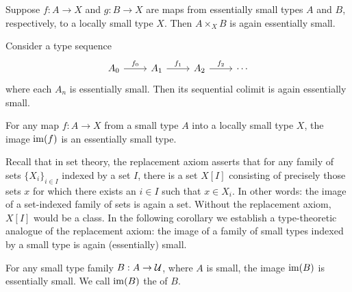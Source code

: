 \begin{cor}
Suppose $f:A\to X$ and $g:B\to X$ are maps from essentially small types $A$ and $B$, respectively, to a locally small type $X$. Then $A\times_X B$ is again essentially small. 
\end{cor}

\begin{lem}
Consider a type sequence
\begin{equation*}
\begin{tikzcd}
A_0 \arrow[r,"f_0"] & A_1 \arrow[r,"f_1"] & A_2 \arrow[r,"f_2"] & \cdots
\end{tikzcd}
\end{equation*}
where each $A_n$ is essentially small. Then its sequential colimit is again essentially small. 
\end{lem}

\begin{thm}\label{thm:image_small}
For any map $f:A\to X$ from a small type $A$ into a locally small type $X$, the image $\operatorname{im}(f)$ is an essentially small type.
\end{thm}

Recall that in set theory, the replacement axiom asserts that for any family of sets $\{X_i\}_{i\in I}$ indexed by a set $I$, there is a set $X[I]$ consisting of precisely those sets $x$ for which there exists an $i\in I$ such that $x\in X_i$. In other words: the image of a set-indexed family of sets is again a set. Without the replacement axiom, $X[I]$ would be a class. In the following corollary we establish a type-theoretic analogue of the replacement axiom: the image of a family of small types indexed by a small type is again (essentially) small.

\begin{cor}\label{cor:im_small}
For any small type family $B:A\to\mathcal{U}$, where $A$ is small, the image $\operatorname{im}(B)$ is essentially small. We call $\operatorname{im}(B)$ the  of $B$. 
\end{cor}

\endinput

\section{Set quotients}\label{sec:set-quotients}

\subsection{Sets in homotopy type theory}
\begin{defn}
A type $A$ is said to be a \define{set} if there is a term of type
\begin{equation*}
\isset(A)\defeq \prd{x,y:A}\isprop(\id{x}{y}).
\end{equation*}
\end{defn}

